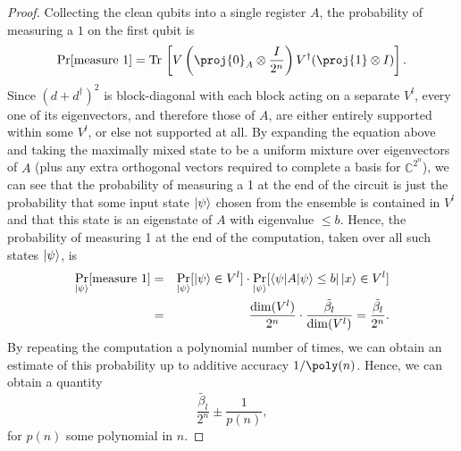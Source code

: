 \documentclass[11pt]{article}
\numberwithin{equation}{section}
\def\Tr{{\rm Tr}\,}
\renewcommand\( {\left(}
\renewcommand\) {\right)}
\renewcommand{\braket}[1]{\langle #1 \rangle}
\begin{document}
\begin{proof}
Collecting the clean qubits into a single register $A$, the probability of measuring a $1$ on the first qubit is
\begin{equation} 
	\Pr[\text{measure }1] = \Tr\left[ V\left(\proj{0}_A \otimes \frac{I}{2^n}\right)V^\dagger (\proj{1} \otimes I) \right].
\end{equation}
Since $(d + d ^\dagger)^2$ is block-diagonal with each block acting on a separate $V^l$, every one of its eigenvectors, and therefore those of $A$, are either entirely supported within some $V^l$, or else not supported at all. By expanding the equation above and taking the maximally mixed state to be a uniform mixture over eigenvectors of $A$ (plus any extra orthogonal vectors required to complete a basis for $\mathbb{C}^{2^n}$), we can see that the probability of measuring a 1 at the end of the circuit is just the probability that some input state $\ket{\psi}$ chosen from the ensemble is contained in $V^l$ and that this state is an eigenstate of $A$ with eigenvalue $\leq b$. Hence, the probability of measuring 1 at the end of the computation, taken over all such states $\ket{\psi}$, is
\begin{eqnarray}
	\Pr_{\ket{\psi}}[\text{measure } 1] &=& \Pr_{\ket{\psi}}[\ket{\psi} \in V^l] \cdot \Pr_{\ket{\psi}}[\braket{\psi|A|\psi} \leq b | \ket{x} \in V^l] \\
	&=& \frac{\dim(V^l)}{2^n} \cdot \frac{\tilde{\beta_l}}{\dim(V^l)} = \frac{\tilde{\beta_l}}{2^n}.
\end{eqnarray}
By repeating the computation a polynomial number of times, we can obtain an estimate of this probability up to additive accuracy $1/\poly(n)$. Hence, we can obtain a quantity 
\begin{equation}\label{eq:betti_number_estimate}
	\frac{\tilde{\beta_l}}{2^n} \pm \frac{1}{p(n)},
\end{equation}
for $p(n)$ some polynomial in $n$. 


\end{proof}
\end{document}
